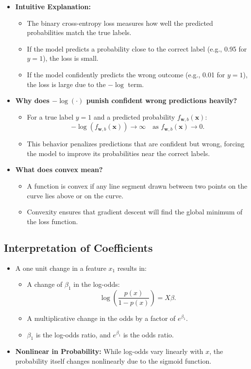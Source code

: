 \documentclass[10pt]{article}
\begin{document}
\begin{itemize}
    \item \textbf{Intuitive Explanation:}
    \begin{itemize}
        \item The binary cross-entropy loss measures how well the predicted probabilities match the true labels.
        \item If the model predicts a probability close to the correct label (e.g., 0.95 for \(y = 1\)), the loss is small.
        \item If the model confidently predicts the wrong outcome (e.g., 0.01 for \(y = 1\)), the loss is large due to the \(-\log\) term.
    \end{itemize}

    \item \textbf{Why does \(-\log(\cdot)\) punish confident wrong predictions heavily?}
    \begin{itemize}
        \item For a true label \(y = 1\) and a predicted probability \(f_{\mathbf{w}, b}(\mathbf{x})\):
        \[
        -\log(f_{\mathbf{w}, b}(\mathbf{x})) \to \infty \quad \text{as } f_{\mathbf{w}, b}(\mathbf{x}) \to 0.
        \]
        \item This behavior penalizes predictions that are confident but wrong, forcing the model to improve its probabilities near the correct labels.
    \end{itemize}

    \item \textbf{What does convex mean?}
    \begin{itemize}
        \item A function is convex if any line segment drawn between two points on the curve lies above or on the curve.
        \item Convexity ensures that gradient descent will find the global minimum of the loss function.
    \end{itemize}
\end{itemize}

\subsection{Interpretation of Coefficients}
\begin{itemize}
    \item A one unit change in a feature \(x_1\) results in:
    \begin{itemize}
        \item A change of \(\beta_1\) in the log-odds:
        \[
        \log\left(\frac{p(x)}{1-p(x)}\right) = X\beta.
        \]
        \item A multiplicative change in the odds by a factor of \(e^{\beta_1}\).
        \item \(\beta_1\) is the log-odds ratio, and \(e^{\beta_1}\) is the odds ratio.
    \end{itemize}
    \item \textbf{Nonlinear in Probability:} While log-odds vary linearly with \(x\), the probability itself changes nonlinearly due to the sigmoid function.
\end{itemize}
\end{document}
